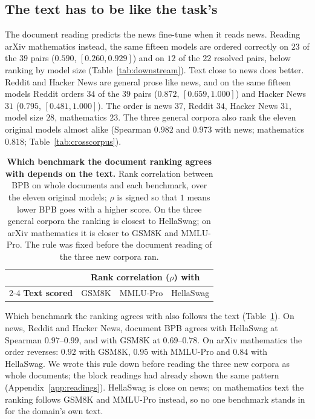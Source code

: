 \documentclass[10pt]{article}
\begin{document}
\subsection{The text has to be like the task's}
\label{sec:owntext}
The document reading predicts the news fine-tune when it reads news. Reading arXiv mathematics
instead, the same fifteen models are ordered correctly on $23$ of the $39$ pairs ($0.590$,
$[0.260, 0.929]$) and on $12$ of the $22$ resolved pairs, below ranking by model size
(Table~\ref{tab:downstream}). Text close to news does better. Reddit and Hacker News are general
prose like news, and on the same fifteen models Reddit orders $34$ of the $39$ pairs ($0.872$,
$[0.659, 1.000]$) and Hacker News $31$ ($0.795$, $[0.481, 1.000]$). The order is news $37$, Reddit
$34$, Hacker News $31$, model size $28$, mathematics $23$. The three general corpora also rank the
eleven original models almost alike (Spearman $0.982$ and $0.973$ with news; mathematics
$0.818$; Table~\ref{tab:crosscorpus}).

\begin{table}[t]
\centering\small
\begin{tabular}{lccc}
\toprule
& \multicolumn{3}{c}{\textbf{Rank correlation ($\rho$) with}} \\
\cmidrule(lr){2-4}
\textbf{Text scored} & GSM8K & MMLU-Pro & HellaSwag \\
\midrule

\bottomrule
\end{tabular}
\caption{\textbf{Which benchmark the document ranking agrees with depends on the text.} Rank
correlation between BPB on whole documents and each benchmark, over the eleven original
models; $\rho$ is signed so that $1$ means lower BPB goes with a higher score. On the
three general corpora the ranking is closest to HellaSwag; on arXiv mathematics it is closer to
GSM8K and MMLU-Pro. The rule was fixed before the document reading of the three new corpora ran.}
\label{tab:docalign}
\end{table}

Which benchmark the ranking agrees with also follows the text (Table~\ref{tab:docalign}). On news,
Reddit and Hacker News, document BPB agrees with HellaSwag at Spearman $0.97$--$0.99$, and with
GSM8K at $0.69$--$0.78$. On arXiv mathematics the order reverses: $0.92$ with GSM8K, $0.95$ with
MMLU-Pro and $0.84$ with HellaSwag. We wrote this rule down before reading the three new corpora as
whole documents; the block readings had already shown the same pattern (Appendix~\ref{app:readings}).
HellaSwag is close on news; on mathematics text the ranking follows GSM8K and MMLU-Pro instead, so
no one benchmark stands in for the domain's own text.
\end{document}
